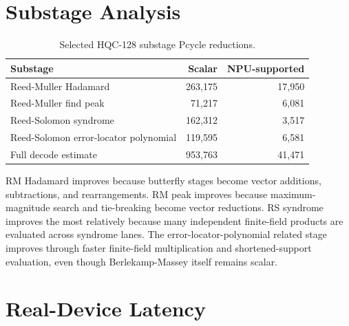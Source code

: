 \documentclass[12pt,a4paper]{report}
\begin{document}
\section{Substage Analysis}
\begin{table}[h]
\centering
\caption{Selected HQC-128 substage Pcycle reductions.}
\label{tab:substages}
\begin{tabular}{lrr}
\toprule
Substage & Scalar & NPU-supported\\
\midrule
Reed-Muller Hadamard & 263,175 & 17,950\\
Reed-Muller find peak & 71,217 & 6,081\\
Reed-Solomon syndrome & 162,312 & 3,517\\
Reed-Solomon error-locator polynomial & 119,595 & 6,581\\
Full decode estimate & 953,763 & 41,471\\
\bottomrule
\end{tabular}
\end{table}

RM Hadamard improves because butterfly stages become vector additions, subtractions, and rearrangements. RM peak improves because maximum-magnitude search and tie-breaking become vector reductions. RS syndrome improves the most relatively because many independent finite-field products are evaluated across syndrome lanes. The error-locator-polynomial related stage improves through faster finite-field multiplication and shortened-support evaluation, even though Berlekamp-Massey itself remains scalar.

\section{Real-Device Latency}
\begin{table}[h]
\centering
\caption{Real-device latency, energy, and throughput-per-watt measurements.}
\label{tab:real-device}
\end{table}
\end{document}
